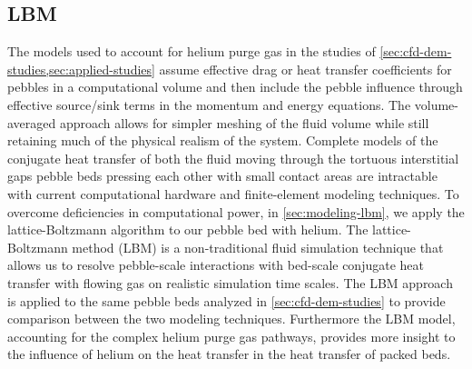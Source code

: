 \subsection*{LBM}
The models used to account for helium purge gas in the studies of \cref{sec:cfd-dem-studies,sec:applied-studies} assume effective drag or heat transfer coefficients for pebbles in a computational volume and then include the pebble influence through effective source/sink terms in the momentum and energy equations. The volume-averaged approach allows for simpler meshing of the fluid volume while still retaining much of the physical realism of the system. Complete models of the conjugate heat transfer of both the fluid moving through the tortuous interstitial gaps pebble beds pressing each other with small contact areas are intractable with current computational hardware and finite-element modeling techniques. To overcome deficiencies in computational power, in \cref{sec:modeling-lbm}, we apply the lattice-Boltzmann algorithm to our pebble bed with helium. The lattice-Boltzmann method (LBM) is a non-traditional fluid simulation technique that allows us to resolve pebble-scale interactions with bed-scale conjugate heat transfer with flowing gas on realistic simulation time scales. The LBM approach is applied to the same pebble beds analyzed in \cref{sec:cfd-dem-studies} to provide comparison between the two modeling techniques. Furthermore the LBM model, accounting for the complex helium purge gas pathways, provides more insight to the influence of helium on the heat transfer in the heat transfer of packed beds.










